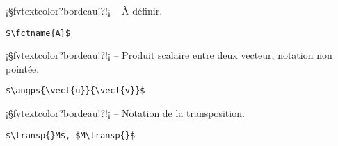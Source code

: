 \documentclass[11pt,a4paper,rgb]{report}
\begin{document}
\setlength{\leftskip}{0pt}
\setlength{\textwidth}{18cm}%


\vspace*{.75cm}

\inCodeStub¡§fvtextcolor?bordeau!?!¡ -- À définir.

\setlength{\leftskip}{.75cm}%
\setlength{\textwidth}{17.25cm}%

\colorbox{blue!15}{}
\hfill
\begin{minipage}{.65\textwidth}
	\begin{lstlisting}[linewidth=\textwidth, language={[LaTeX]TeX}]
	$\fctname{A}$
	\end{lstlisting}
\end{minipage}

\setlength{\leftskip}{0pt}
\setlength{\textwidth}{18cm}%


\vspace*{.75cm}

\inCodeStub¡§fvtextcolor?bordeau!?!¡ -- Produit scalaire entre deux vecteur, notation non pointée.

\setlength{\leftskip}{.75cm}%
\setlength{\textwidth}{17.25cm}%

\colorbox{blue!15}{}
\hfill
\begin{minipage}{.65\textwidth}
	\begin{lstlisting}[linewidth=\textwidth, language={[LaTeX]TeX}]
	$\angps{\vect{u}}{\vect{v}}$
	\end{lstlisting}
\end{minipage}

\setlength{\leftskip}{0pt}
\setlength{\textwidth}{18cm}%


\vspace*{.75cm}

\inCodeStub¡§fvtextcolor?bordeau!?\transp{}!¡ -- Notation de la transposition.

\setlength{\leftskip}{.75cm}%
\setlength{\textwidth}{17.25cm}%

\colorbox{blue!15}{}
\hfill
\begin{minipage}{.65\textwidth}
	\begin{lstlisting}[linewidth=\textwidth, language={[LaTeX]TeX}]
	$\transp{}M$, $M\transp{}$
	\end{lstlisting}
\end{minipage}
\end{document}
